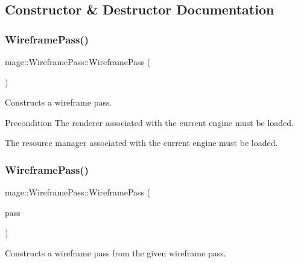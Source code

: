 \subsection{Constructor \& Destructor Documentation}
\hypertarget{classmage_1_1_wireframe_pass_a7323b3caca5d06a068a89c0333651f04}{}\label{classmage_1_1_wireframe_pass_a7323b3caca5d06a068a89c0333651f04} 
\subsubsection{\texorpdfstring{Wireframe\+Pass()}{WireframePass()}\hspace{0.1cm}{\footnotesize\ttfamily [1/3]}}
{\footnotesize\ttfamily mage\+::\+Wireframe\+Pass\+::\+Wireframe\+Pass (\begin{DoxyParamCaption}{ }\end{DoxyParamCaption})}

Constructs a wireframe pass.

\begin{DoxyPrecond}{Precondition}
The renderer associated with the current engine must be loaded. 

The resource manager associated with the current engine must be loaded. 
\end{DoxyPrecond}
\hypertarget{classmage_1_1_wireframe_pass_ac0410afcafa22b8cd50c1a6e19c44c3e}{}\label{classmage_1_1_wireframe_pass_ac0410afcafa22b8cd50c1a6e19c44c3e} 
\subsubsection{\texorpdfstring{Wireframe\+Pass()}{WireframePass()}\hspace{0.1cm}{\footnotesize\ttfamily [2/3]}}
{\footnotesize\ttfamily mage\+::\+Wireframe\+Pass\+::\+Wireframe\+Pass (\begin{DoxyParamCaption}\item[{const \hyperlink{classmage_1_1_wireframe_pass}{Wireframe\+Pass} \&}]{pass }\end{DoxyParamCaption})\hspace{0.3cm}{\ttfamily [delete]}}

Constructs a wireframe pass from the given wireframe pass.


